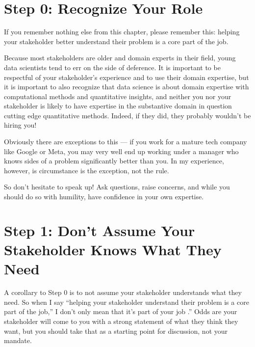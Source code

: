 \documentclass[letterpaper,10pt,english]{jupyterBook}
\begin{document}
\section{Step 0: Recognize Your Role}
\label{\detokenize{20_problems_to_questions/20_stakeholder_management:step-0-recognize-your-role}}
\sphinxAtStartPar
If you remember nothing else from this chapter, please remember this: helping your stakeholder better understand their problem is a core part of the job.

\sphinxAtStartPar
Because most stakeholders are older and domain experts in their field, young data scientists tend to err on the side of deference. It is important to be respectful of your stakeholder’s experience and to use their domain expertise, but it is important to also recognize that data science is about  domain expertise with computational methods and quantitative insights, and neither you nor your stakeholder is likely to have expertise in  the substantive domain in question  cutting edge quantitative methods. Indeed, if they did, they probably wouldn’t be hiring you!%
\begin{footnote}[1]\sphinxAtStartFootnote
Obviously there are exceptions to this — if you work for a mature tech company like Google or Meta, you may very well end up working under a manager who knows sides of a problem significantly better than you. In my experience, however, is circumstance is the exception, not the rule.
%
\end{footnote} So don’t hesitate to speak up! Ask questions, raise concerns, and while you should do so with  humility, have confidence in your own expertise.


\section{Step 1: Don’t Assume Your Stakeholder Knows What They Need}
\label{\detokenize{20_problems_to_questions/20_stakeholder_management:step-1-don-t-assume-your-stakeholder-knows-what-they-need}}
\sphinxAtStartPar
A corollary to Step 0 is to not assume your stakeholder understands what they need. So when I say “helping your stakeholder understand their problem is a core part of the job,” I don’t only mean that it’s part of your job .” Odds are your stakeholder will come to you with a strong statement of what they think they want, but you should take that as a starting point for discussion, not your mandate.
\end{document}
